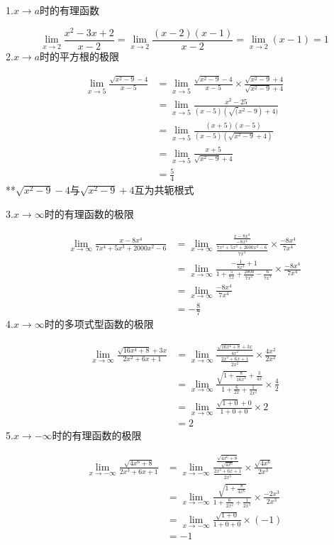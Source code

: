 \documentclass[UTF8,fontset=ubuntu]{ctexart}
\begin{document}
\parindent=0pt
1.$x\to a$时的有理函数\par
\begin{equation*}
	\lim_{x\to 2}\frac{x^2-3x+2}{x-2}=\lim_{x\to 2}\frac{(x-2)(x-1)}{x-2}=\lim_{x\to 2}(x-1)=1
\end{equation*}
2.$x\to a$时的平方根的极限\par
\begin{align*}
	\lim_{x\to 5}\frac{\sqrt{x^2-9}-4}{x-5}&=\lim_{x\to 5}\frac{\sqrt{x^2-9}-4}{x-5}\times\frac{\sqrt{x^2-9}+4}{\sqrt{x^2-9}+4}\\
	&=\lim_{x\to 5}\frac{x^2-25}{(x-5)(\sqrt(x^2-9)+4)}\\
	&=\lim_{x\to 5}\frac{(x+5)(x-5)}{(x-5)(\sqrt{x^2-9}+4)}\\
	&=\lim_{x\to 5}\frac{x+5}{\sqrt{x^2-9}+4}\\
	&=\frac{5}{4}
\end{align*}
**$\sqrt{x^2-9}-4$与$\sqrt{x^2-9}+4$互为共轭根式\par
3.$x\to\infty$时的有理函数的极限\par
\begin{align*}
	\lim_{x\to\infty}\frac{x-8x^4}{7x^4+5x^3+2000x^2-6}&=\lim_{x\to\infty}\frac{\frac{x-8x^4}{-8x^4}}{\frac{7x^4+5x^3+2000x^2-6}{7x^4}}\times\frac{-8x^4}{7x^4}\\
													   &=\lim_{x\to\infty}\frac{-\frac{1}{8x^3}+1}{1+\frac{5}{7x}+\frac{2000}{7x^2}-\frac{6}{7x^4}}\times\frac{-8x^4}{7x^4}\\
													   &=\lim_{x\to\infty}\frac{-8x^4}{7x^4}\\
													   &=-\frac{8}{7}
\end{align*}
4.$x\to\infty$时的多项式型函数的极限\par
\begin{align*}
	\lim_{x\to\infty}\frac{\sqrt{16x^4+8}+3x}{2x^2+6x+1}&=\lim_{x\to\infty}\frac{\frac{\sqrt{16x^4+8}+3x}{4x^2}}{\frac{2x^2+6x+1}{2x^2}}\times\frac{4x^2}{2x^2}\\
														&=\lim_{x\to\infty}\frac{\sqrt{1+\frac{8}{16x^4}}+\frac{3}{4x}}{1+\frac{6}{2x}+\frac{1}{2x^2}}\times\frac{4}{2}\\
														&=\lim_{x\to\infty}\frac{\sqrt{1+0}+0}{1+0+0}\times2\\
														&=2
\end{align*}
5.$x\to-\infty$时的有理函数的极限\par
\begin{align*}
	\lim_{x\to-\infty}\frac{\sqrt{4x^6+8}}{2x^3+6x+1}&=\lim_{x\to-\infty}\frac{\frac{\sqrt{4x^6+8}}{\sqrt{4x^6}}}{\frac{2x^3+6x+1}{2x^3}}\times\frac{\sqrt{4x^6}}{2x^3}\\
													 &=\lim_{x\to-\infty}\frac{\sqrt{1+\frac{8}{4x^6}}}{1+\frac{6}{2x^2}+\frac{1}{2x^3}}\times\frac{-2x^3}{2x^3}\\
													 &=\lim_{x\to-\infty}\frac{\sqrt{1+0}}{1+0+0}\times(-1)\\
													 &=-1
\end{align*}
\end{document}
